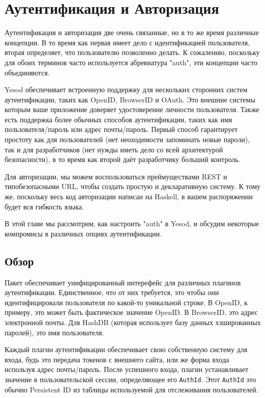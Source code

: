 \chapter{Аутентификация и Авторизация}\label{chap:auth}

Аутентификация и авторизация две очень связанные, но в то же время различные концепции. В то время как первая имеет дело с идентификацией пользователя, вторая определяет, что пользователю позволенно делать. К сожалению, поскольку для обоих терминов часто используется абревиатура "auth", эти концепции часто объединяются.

Yesod обеспечивает встроенную поддержку для нескольких сторонних систем аутентификации, таких как OpenID, BrowserID и OAuth. Это внешние системы которым ваше приложение доверяет удостоверение личности пользователя. Также есть поддержка более обычных способов аутентификации, таких как имя пользователя/пароль или адрес почты/пароль. Первый способ гарантирует простоту как для пользователей (нет неоходимости запоминать новые пароли), так и для разработчиков (нет нужды иметь дело со всей архитектурой безопасности), в то время как второй даёт разработчику больший контроль.

Для авторизации, мы можем воспользоваться преймуществами REST и типобезопасными URL, чтобы создать простую и декларативную систему. К тому же, поскольку весь код авторизации написан на Haskell, в вашем распоряжении будет вся гибкость языка.

В этой главе мы рассмотрим, как настроить "auth" в Yesod, и обсудим некоторые компромисы в различных опциях аутентификации.

\section{Обзор}

Пакет  обеспечивает унифицированный интерефейс для различных плагинов аутентификации. Единственное, что от них требуется, это чтобы они идентифицировали пользователя по какой-то уникальной строке. В OpenID, к примеру, это может быть фактическое значение OpenID. В BrowserID, это адрес электронной почты. Для HashDB (которая использует базу данных хэшированных паролей), это имя пользователя.

Каждый плагин аутентификации обеспечивает свою собственную систему для входа, будь это передача токенов с внешнего сайта, или же форма входа используя адрес почты/пароль. После успешного входа, плагин устанавливает значение в пользовательской сессии, определяющее его \lstinline'AuthId'. Этот \lstinline'AuthId' это обычно Persistent ID из таблицы используемой для отслеживания пользователей. 

